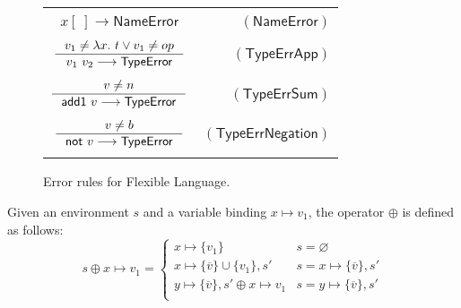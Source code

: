 \documentclass[preprint,authoryear,sort&compress,9pt,nocopyrightspace]{article}
\newcommand\rulename[1]{\mathsf{(#1)}}
\newcommand{\tto}{\longrightarrow}
\newcommand{\absST}[2]{\lambda #1. \ #2}
\newcommand{\negacion}[1]{\mathsf{not} \ #1}
\newcommand{\suma}[1]{\mathsf{add1} \ #1}
\newcommand{\nameerror}{\mathsf{NameError}}
\newcommand{\typeerror}{\mathsf{TypeError}}
\newcommand{\semanticA}{Flexible Language}
\begin{document}
\begin{figure}[h]
\begin{small}
\begin{center}
\begin{tabular}{|c r|}
\hline
&\\
$x[ \ ] \tto \nameerror$&$\rulename{NameError}$\\
&\\
$\inference {v_1 \neq \absST {x}{t} \vee v_1 \neq op}{v_1 \ v_2 \tto \typeerror}$&$\rulename{TypeErrApp}$\\
&\\
$\inference {v \neq n}{\suma{v} \tto \typeerror}$&$\rulename{TypeErrSum}$\\
&\\
$\inference {v \neq b}{\negacion{v} \tto \typeerror }$&$\rulename{TypeErrNegation}$\\
&\\
\hline
\end{tabular}
\caption{Error rules for \semanticA.}
\label{tabla:rules1errors}
\end{center}
\end{small}
\end{figure}


\begin{definition}[$\oplus$]
\label{definition:tcs}
\mbox{}
Given an environment  $s$ and a variable binding $x \mapsto v_1$, the operator $\oplus$ is defined  as follows:
\[ s \oplus x \mapsto v_1 = \begin{cases} 
      x \mapsto \{v_1\}& s =  \varnothing \\
      x \mapsto \{\overline{v}\} \cup \{v_1\}, s' & s = x \mapsto \{\overline{v }\}, s'\\
      y \mapsto \{\overline{v}\}, s' \oplus x \mapsto v_1 & s = y \mapsto \{\overline{v}\}, s'\\
   \end{cases}
\]
\end{definition}
\end{document}
